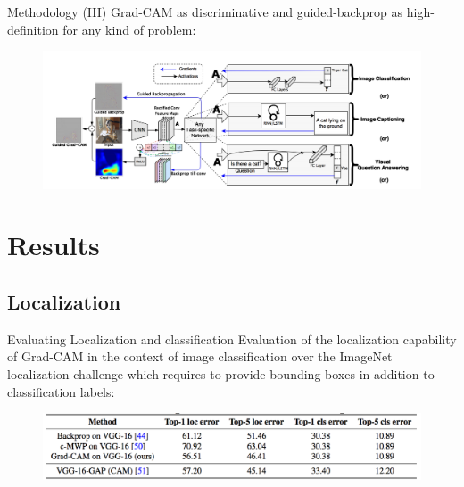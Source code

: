 \documentclass[11pt]{beamer}
\begin{document}
\begin{frame}{Methodology (III)}
Grad-CAM as discriminative and guided-backprop as high-definition for any kind of problem:
\begin{figure}
    \includegraphics[width=1.05\textwidth]{g3.png}
\end{figure}
\end{frame}



\section{Results}

\frame{\tableofcontents[currentsection]}

\subsection{Localization}
\begin{frame}{Evaluating Localization and classification}
Evaluation of the localization capability
of Grad-CAM in the context of image classification over the ImageNet localization challenge which requires to provide bounding boxes in addition to classification labels:

\begin{figure}
    \includegraphics[width=1.\textwidth]{g4.png}
\end{figure}
\end{frame}
\end{document}
